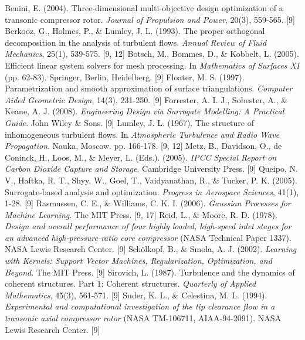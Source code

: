 \documentclass[12pt, a4paper]{report}
\begin{document}
\begin{thebibliography}{99}
 Benini, E. (2004). Three-dimensional multi-objective design optimization of a transonic compressor rotor. \textit{Journal of Propulsion and Power}, 20(3), 559-565. [9]
 Berkooz, G., Holmes, P., \& Lumley, J. L. (1993). The proper orthogonal decomposition in the analysis of turbulent flows. \textit{Annual Review of Fluid Mechanics}, 25(1), 539-575. [9, 12]
 Botsch, M., Bommes, D., \& Kobbelt, L. (2005). Efficient linear system solvers for mesh processing. In \textit{Mathematics of Surfaces XI} (pp. 62-83). Springer, Berlin, Heidelberg. [9]
 Floater, M. S. (1997). Parametrization and smooth approximation of surface triangulations. \textit{Computer Aided Geometric Design}, 14(3), 231-250. [9]
 Forrester, A. I. J., Sobester, A., \& Keane, A. J. (2008). \textit{Engineering Design via Surrogate Modelling: A Practical Guide}. John Wiley \& Sons. [9]
 Lumley, J. L. (1967). The structure of inhomogeneous turbulent flows. In \textit{Atmospheric Turbulence and Radio Wave Propagation}. Nauka, Moscow. pp. 166-178. [9, 12]
 Metz, B., Davidson, O., de Coninck, H., Loos, M., \& Meyer, L. (Eds.). (2005). \textit{IPCC Special Report on Carbon Dioxide Capture and Storage}. Cambridge University Press. [9]
 Queipo, N. V., Haftka, R. T., Shyy, W., Goel, T., Vaidyanathan, R., \& Tucker, P. K. (2005). Surrogate-based analysis and optimization. \textit{Progress in Aerospace Sciences}, 41(1), 1-28. [9]
 Rasmussen, C. E., \& Williams, C. K. I. (2006). \textit{Gaussian Processes for Machine Learning}. The MIT Press. [9, 17]
 Reid, L., \& Moore, R. D. (1978). \textit{Design and overall performance of four highly loaded, high-speed inlet stages for an advanced high-pressure-ratio core compressor} (NASA Technical Paper 1337). NASA Lewis Research Center. [9]
 Schölkopf, B., \& Smola, A. J. (2002). \textit{Learning with Kernels: Support Vector Machines, Regularization, Optimization, and Beyond}. The MIT Press. [9]
 Sirovich, L. (1987). Turbulence and the dynamics of coherent structures. Part 1: Coherent structures. \textit{Quarterly of Applied Mathematics}, 45(3), 561-571. [9]
 Suder, K. L., \& Celestina, M. L. (1994). \textit{Experimental and computational investigation of the tip clearance flow in a transonic axial compressor rotor} (NASA TM-106711, AIAA-94-2091). NASA Lewis Research Center. [9]

\end{thebibliography}
\end{document}
